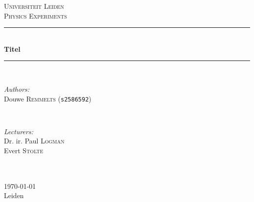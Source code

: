 \documentclass[a4paper]{article} %
\begin{document}

\begin{titlepage}

\newcommand{\HRule}{\rule{\linewidth}{0.5mm}} %

\center %
\begin{figure}[H]  \end{figure}
\textsc{\LARGE Universiteit Leiden}\\[1.5cm] %
\textsc{\Large Physics Experiments}\\[0.5cm] %

\HRule \\[0.4cm]
{ \huge \bfseries Titel}\\[0.4cm] %
\HRule \\[1.5cm]

\begin{minipage}{0.45\textwidth}
\begin{flushleft} \large
\emph{Authors:}\\
Douwe \textsc{Remmelts} \small{(\texttt{s2586592})}\\
\end{flushleft}
\end{minipage}
~
\begin{minipage}{0.4\textwidth}
\begin{flushright} \large
\emph{Lecturers:} \\
Dr. ir. Paul \textsc{Logman}\\ %
Evert \textsc{Stolte}\\ %
\hspace{1cm} \\
\end{flushright}
\end{minipage}\\[4cm]

{\large \today\\Leiden}\\[3cm] %

\vfill %

\end{titlepage}
\end{document}
